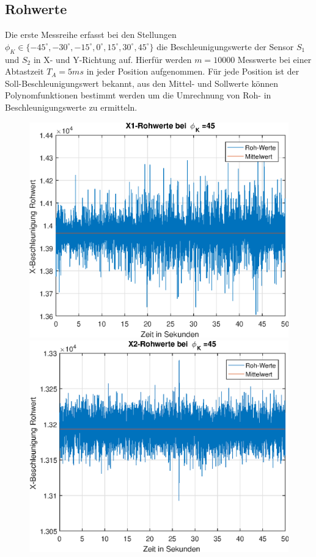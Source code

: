 \documentclass{article}
\begin{document}
\subsection{Rohwerte}
Die erste Messreihe erfasst bei den Stellungen $\phi_K \in \{-45^\circ, -30^\circ, -15^\circ, 0^\circ, 15^\circ, 30^\circ, 45^\circ \}$ die Beschleunigungswerte der Sensor $S_1$ und $S_2$ in X- und Y-Richtung auf. Hierfür werden $m = 10000$ Messwerte bei einer Abtastzeit $T_A = 5ms$ in jeder Position aufgenommen. Für jede Position ist der Soll-Beschleunigungswert bekannt, aus den Mittel- und Sollwerte können Polynomfunktionen bestimmt werden um die Umrechnung von Roh- in Beschleunigungswerte zu ermitteln.

\begin{figure}[h]
	\includegraphics[width=0.5\linewidth]{img/phiK45_x1_raw.eps}
	\includegraphics[width=0.5\linewidth]{img/phiK45_x2_raw.eps}
\end{figure}
\end{document}
